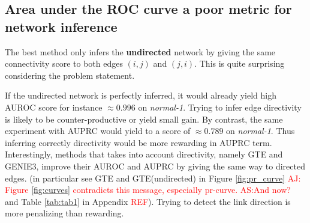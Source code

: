 \documentclass[wcp]{jmlr}
\begin{document}




\subsection*{Area under the ROC curve a poor metric for network inference}

The best method only infers the \textbf{undirected} network by giving the
same connectivity score to both edges $(i,j)$ and $(j,i)$. This is quite
surprising considering the problem statement.

If the undirected network is perfectly inferred, it would already yield
high AUROC score for instance $\approx{}0.996$ on \textit{normal-1}. Trying
to infer edge directivity is likely to be counter-productive or yield
small gain.
By contrast, the same experiment with AUPRC would yield
to a score of $\approx 0.789$ on \textit{normal-1}. Thus inferring
correctly directivity would be more rewarding in AUPRC term.
Interestingly, methods that takes into account directivity, namely GTE and
GENIE3, improve their AUROC and AUPRC by giving the same way to directed edges.
(in particular see GTE and GTE(undirected) in Figure \ref{fig:pr_curve}
\textcolor{red}{AJ: Figure \ref{fig:curves}  contradicts this message,
especially pr-curve. AS:And now?} and Table \ref{tab:tab1} in Appendix \textcolor{red}{REF}).
Trying to detect the link direction is more penalizing than rewarding.
\end{document}
